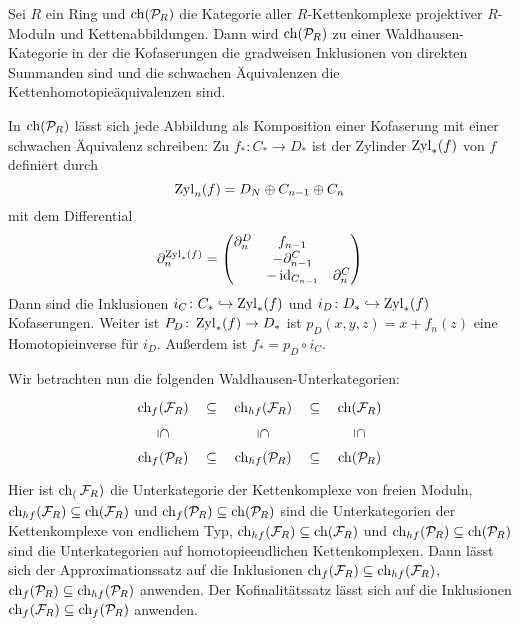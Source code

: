 \begin{beispiel}
	Sei $R$ ein Ring und $\operatorname{ch}(\mathcal{P}\mkern-2mu_R)$ die Kategorie aller $R$-Kettenkomplexe projektiver $R$-Moduln und Kettenabbildungen.
	Dann wird $\operatorname{ch}(\mathcal{P}\mkern-2mu_R)$ zu einer Waldhausen-Kategorie in der die Kofaserungen die gradweisen Inklusionen von direkten Summanden sind und die schwachen Äquivalenzen die Kettenhomotopieäquivalenzen sind.
	
	In $\operatorname{ch}(\mathcal{P}\mkern-2mu_R)$ lässt sich jede Abbildung als Komposition einer Kofaserung mit einer schwachen Äquivalenz schreiben:
	Zu $f_* \colon C_* \to D_*$ ist der Zylinder $\operatorname{Zyl}_*(f)$ von $f$ definiert durch
	\[
		\operatorname{Zyl}_n(f) = D_N \oplus C_{n-1} \oplus C_n
	\]
	mit dem Differential 
	\[
		\partial^{\operatorname{Zyl}_*(f)}_n = \begin{pmatrix}
			\partial^D_n & f_{n-1} & \\
			& -\partial^C_{n-1} & \\
			& -\operatorname{id}_{C_{n-1}} & \partial^C_n
		\end{pmatrix}
	\]
	Dann sind die Inklusionen $i_C \colon C_* \hookrightarrow \operatorname{Zyl}_*(f)$ und $i_D \colon D_* \hookrightarrow \operatorname{Zyl}_*(f)$ Kofaserungen.
	Weiter ist $P_D \colon \operatorname{Zyl}_*(f) \to D_*$ ist $p_D(x,y,z) = x + f_n(z)$ eine Homotopieinverse für $i_D$.
	Außerdem ist $f_* = p_D \circ i_C$.
	
	Wir betrachten nun die folgenden Waldhausen-Unterkategorien: 
	\[
		\begin{tikzcd}
			\ch_f(\mathcal{F}_R) \dar[phantom,sloped,"\subseteq"] \rar[phantom,sloped,"\subseteq"] & \ch_{hf}(\mathcal{F}_R) \rar[phantom,sloped,"\subseteq"] \dar[phantom,sloped,"\subseteq"] & \ch(\mathcal{F}_R) \dar[phantom,sloped,"\subseteq"]\\
			\ch_f(\kernedP_R) \rar[phantom,sloped,"\subseteq"] & \ch_{hf}(\kernedP_R)  \rar[phantom,sloped,"\subseteq"] & \ch(\kernedP_R)
		\end{tikzcd}
	\]
	Hier ist $\operatorname{ch}_(\mathcal{F}_R)$ die Unterkategorie der Kettenkomplexe von freien Moduln, $\operatorname{ch}_{hf}(\mathcal{F}_R) \subseteq \operatorname{ch}(\mathcal{F}_R)$ und $\operatorname{ch}_f(\mathcal{P}\mkern-2mu_R) \subseteq \operatorname{ch}(\mathcal{P}\mkern-2mu_R)$ sind die Unterkategorien der Kettenkomplexe von endlichem Typ, $\operatorname{ch}_{hf}(\mathcal{F}_R) \subseteq \operatorname{ch}(\mathcal{F}_R)$   und $\operatorname{ch}_{hf}(\mathcal{P}\mkern-2mu_R) \subseteq \operatorname{ch}(\mathcal{P}\mkern-2mu_R)$ sind die Unterkategorien auf homotopieendlichen Kettenkomplexen.
	Dann lässt sich der Approximationssatz auf die Inklusionen $\operatorname{ch}_f(\mathcal{F}_R) \subseteq \operatorname{ch}_{hf}(\mathcal{F}_R)$, $\operatorname{ch}_f(\mathcal{P}\mkern-2mu_R) \subseteq \operatorname{ch}_{hf}(\mathcal{P}\mkern-2mu_R)$ anwenden.
	Der Kofinalitätssatz lässt sich auf die Inklusionen $\operatorname{ch}_{f}(\mathcal{F}_R) \subseteq \operatorname{ch}_f(\mathcal{P}\mkern-2mu_R)$ anwenden.
\end{beispiel}

